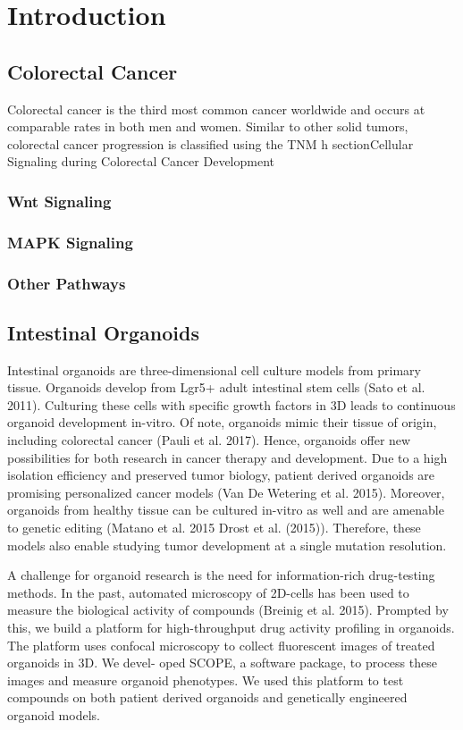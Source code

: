 \chapter{Introduction}
\label{introduction}

\section{Colorectal Cancer}
Colorectal cancer is the third most common cancer worldwide and occurs at comparable rates in both men and women. Similar to other solid tumors, colorectal cancer progression is classified using the TNM 
\botdevelopment h section{Cellular Signaling during Colorectal Cancer Development}
\subsection{Wnt Signaling} %
\subsection{MAPK Signaling}
\subsection{Other Pathways}
\section{Intestinal Organoids}
Intestinal organoids are three-dimensional cell culture models from primary tissue. Organoids develop from Lgr5+ adult intestinal stem cells (Sato et al. 2011). Culturing these cells with specific growth factors in 3D leads to continuous organoid development in-vitro. Of note, organoids mimic their tissue of origin, including colorectal cancer (Pauli et al. 2017). Hence, organoids offer new possibilities for both research in cancer therapy and development. Due to a high isolation efficiency and preserved tumor biology, patient derived organoids are promising personalized cancer models (Van De Wetering et al. 2015). Moreover, organoids from healthy tissue can be cultured in-vitro as well and are amenable to genetic editing (Matano et al. 2015 Drost et al. (2015)). Therefore, these models also enable studying tumor development at a single mutation resolution.

A challenge for organoid research is the need for information-rich drug-testing methods. In the past, automated microscopy of 2D-cells has been used to measure the biological activity of compounds (Breinig et al. 2015). Prompted by this, we build a platform for high-throughput drug activity profiling in organoids. The platform uses confocal microscopy to collect fluorescent images of treated organoids in 3D. We devel- oped SCOPE, a software package, to process these images and measure organoid phenotypes. We used this platform to test compounds on both patient derived organoids and genetically engineered organoid models.

